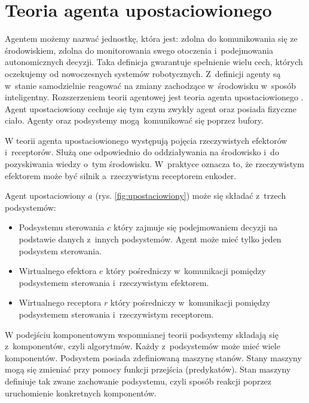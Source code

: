 \section{Teoria agenta upostaciowionego}
Agentem możemy nazwać jednostkę, która jest: zdolna do komunikowania się ze środowiskiem, zdolna do monitorowania swego otoczenia i~podejmowania autonomicznych decyzji. Taka definicja gwarantuje spełnienie wielu cech, których oczekujemy od nowoczesnych systemów robotycznych. Z~definicji agenty są w~stanie samodzielnie reagować na zmiany zachodzące w~środowisku w~sposób inteligentny. Rozszerzeniem teorii agentowej jest teoria agenta upostaciowionego \cite{bib:agent1} \cite{bib:agent2}. Agent upostaciowiony cechuje się tym czym zwykły agent oraz posiada fizyczne ciało. Agenty oraz podsystemy mogą komunikować się poprzez bufory.


W teorii agenta upostaciowionego występują pojęcia rzeczywistych efektorów i~receptorów. Służą one odpowiednio do oddziaływania na środowisko i~do pozyskiwania wiedzy o~tym środowisku. W~praktyce oznacza to, że rzeczywistym efektorem może być silnik a~rzeczywistym receptorem enkoder. 

Agent upostaciowiony $a$  (rys. \ref{fig:upostaciowiony}) może się składać z~trzech podsystemów:
\begin{itemize}
	\item Podsystemu sterowania $c$ który zajmuje się podejmowaniem decyzji na podstawie danych z~innych podsystemów. Agent może mieć tylko jeden podsystem sterowania.
	\item Wirtualnego efektora $e$ który pośredniczy w~komunikacji pomiędzy podsystemem sterowania i~rzeczywistym efektorem.
	\item Wirtualnego receptora $r$ który pośredniczy w~komunikacji pomiędzy podsystemem sterowania i~rzeczywistym receptorem.
\end{itemize}

W podejściu komponentowym wspomnianej teorii podsystemy składają się z~komponentów, czyli algorytmów. Każdy z~podsystemów może mieć wiele komponentów. Podsystem posiada zdefiniowaną maszynę stanów. Stany maszyny mogą się zmieniać przy pomocy funkcji przejścia (predykatów). Stan maszyny definiuje tak zwane zachowanie podsystemu, czyli sposób reakcji poprzez uruchomienie konkretnych komponentów. 

